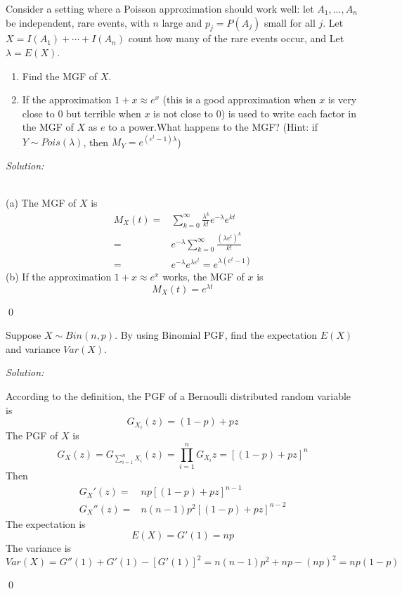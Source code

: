 \documentclass[12pt]{article}
\newenvironment{problem}[2][Problem]{\begin{trivlist}
\item[\hskip \labelsep {\bfseries #1}\hskip \labelsep {\bfseries #2.}]}{\end{trivlist}}
\newenvironment{sol}
    {\emph{Solution:}
    }
    {
    \qed
    }
\begin{document}
\begin{problem}{4}
Consider a setting where a Poisson approximation should work well: let $A_1,...,A_n$ be independent, rare events, with $n$ large and $p_j=P(A_j)$ small for all $j$. Let $X=I(A_1)+\cdots+I(A_n)$ count how many of the rare events occur, and Let $\lambda = E(X)$.
\begin{enumerate}
    \item[(a).] Find the MGF of $X$.
    \item[(b).] If the approximation $1+x\approx e^x$ (this is a good approximation when $x$ is very close to $0$ but terrible when $x$ is not close to $0$) is used to write each factor in the MGF of $X$ as $e$ to a power.What happens to the MGF? 
    (Hint: if $Y\sim Pois(\lambda)$, then $M_Y=e^{(e^t-1)\lambda}$)
\end{enumerate}
\end{problem}
\begin{sol}
\\(a) The MGF of $X$ is
\begin{align*}
M_X(t)=&\sum_{k=0}^{\infty}\frac{\lambda^k}{k!}e^{-\lambda}e^{kt}\\
=&e^{-\lambda}\sum_{k=0}^{\infty}\frac{(\lambda e^t)^k}{k!}\\
=&e^{-\lambda}e^{\lambda e^t}=e^{\lambda(e^t-1)}
\end{align*}
(b) If the approximation $1+x\approx e^x$ works, the MGF of $x$ is
\[
M_X(t)=e^{\lambda t}
\]
\end{sol}



\begin{problem}{5}
Suppose $X\sim Bin(n,p)$.
By using Binomial PGF, find the expectation $E(X)$ and variance $Var(X)$.
\end{problem}
\begin{sol}
According to the definition, the PGF of a Bernoulli distributed random variable is
\[
G_{X_i}(z)=(1-p)+pz
\]
The PGF of $X$ is
\[
G_{X}(z)=G_{\sum_{i=1}^nX_i}(z)=\prod_{i=1}^nG_{X_i}{z}=[(1-p)+pz]^n
\]
Then
\begin{align*}
G_X'(z)=&np[(1-p)+pz]^{n-1}\\
G_X''(z)=&n(n-1)p^2[(1-p)+pz]^{n-2}
\end{align*}
The expectation is
\[
E(X)=G'(1)=np
\]
The variance is
\[
Var(X)=G''(1)+G'(1)-[G'(1)]^2=n(n-1)p^2+np-(np)^2=np(1-p)
\]
\end{sol}
\end{document}
